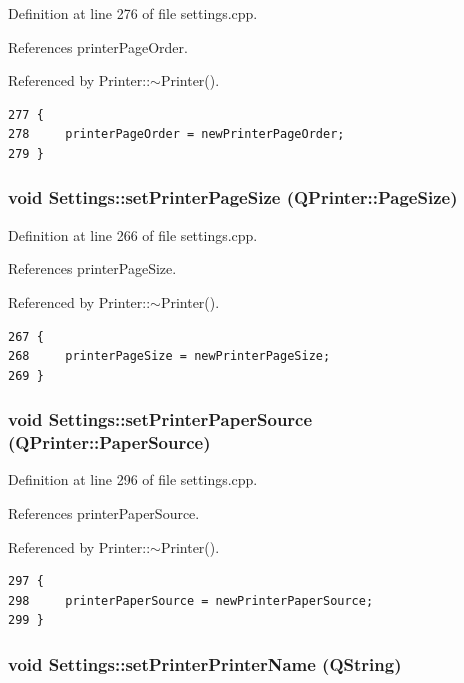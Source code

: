 Definition at line 276 of file settings.cpp.

References printer\-Page\-Order.

Referenced by Printer::$\sim$Printer().

\footnotesize\begin{verbatim}277 {
278     printerPageOrder = newPrinterPageOrder;
279 }
\end{verbatim}\normalsize 


\hypertarget{classSettings_a30}{
\subsubsection[setPrinterPageSize]{\setlength{\rightskip}{0pt plus 5cm}void Settings::set\-Printer\-Page\-Size (QPrinter::Page\-Size)}}
\label{classSettings_a30}


Definition at line 266 of file settings.cpp.

References printer\-Page\-Size.

Referenced by Printer::$\sim$Printer().

\footnotesize\begin{verbatim}267 {
268     printerPageSize = newPrinterPageSize;
269 }
\end{verbatim}\normalsize 


\hypertarget{classSettings_a36}{
\subsubsection[setPrinterPaperSource]{\setlength{\rightskip}{0pt plus 5cm}void Settings::set\-Printer\-Paper\-Source (QPrinter::Paper\-Source)}}
\label{classSettings_a36}


Definition at line 296 of file settings.cpp.

References printer\-Paper\-Source.

Referenced by Printer::$\sim$Printer().

\footnotesize\begin{verbatim}297 {
298     printerPaperSource = newPrinterPaperSource;
299 }
\end{verbatim}\normalsize 


\hypertarget{classSettings_a20}{
\subsubsection[setPrinterPrinterName]{\setlength{\rightskip}{0pt plus 5cm}void Settings::set\-Printer\-Printer\-Name (QString)}}
\label{classSettings_a20}


